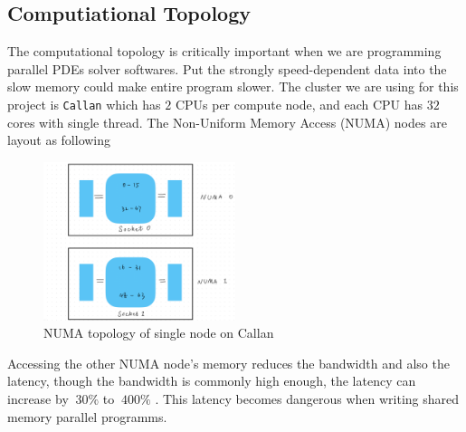\subsection{Computiational Topology}
The computational topology is critically important when we are programming parallel PDEs solver softwares.
Put the strongly speed-dependent data into the slow memory could make entire program slower.
The cluster we are using for this project is \texttt{Callan} \cite{Callan_TCD} which has 
$2$ CPUs per compute node, and each CPU has $32$ cores with single thread. 
The Non-Uniform Memory Access (NUMA) nodes are layout as following 
\begin{figure}[htbp]
  \centering
  \includegraphics[width=0.5\textwidth]{figure/FIG_Topology_Callan.jpg}
  \caption{NUMA topology of single node on Callan}
  \label{FIG_Topology_Callan}
\end{figure}
Accessing the other NUMA node's memory reduces the bandwidth and also the latency,
though the bandwidth is commonly high enough, the latency can increase by 
$~30\%$ to $~400\%$ \cite{NUMA_Latency_TCD}. 
This latency becomes dangerous when writing shared memory parallel programms.





